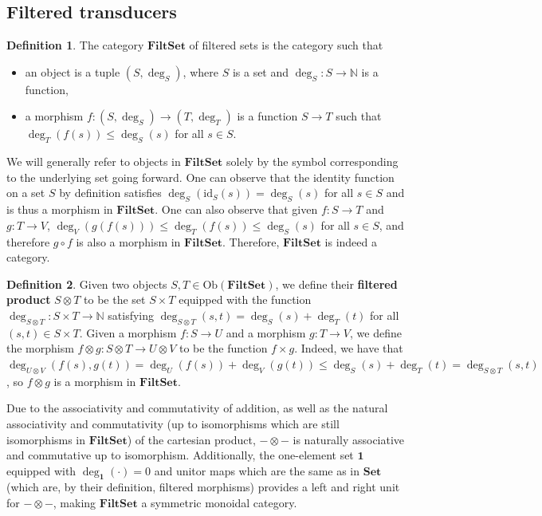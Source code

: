 \documentclass{article}
\theoremstyle{definition}
\newtheorem{definition}{Definition}[section]
\theoremstyle{remark}
\begin{document}
\subsection{Filtered transducers}
\begin{definition}
    \label{def:filtsetcat} The
    category $\mathbf{FiltSet}$ of filtered sets is the category such that
    \begin{itemize}
    \item an object is a tuple $(S,\deg_S)$, where $S$ is a set and
    $\deg_S:S \to \mathbb{N}$ is a function,
    \item a morphism $f:(S,\deg_S) \to (T,\deg_T)$ is a function
    $S \to T$ such that $\deg_T(f(s)) \leq \deg_S(s)$ for all $s\in S$. 
    \end{itemize}
\end{definition}
We will generally refer to objects in $\mathbf{FiltSet}$ solely
by the symbol corresponding to the underlying set going forward. One
can observe that the identity function on a set $S$ by definition satisfies
$\deg_S(\mathrm{id}_S(s))=\deg_S(s)$ for all $s \in S$ and is thus a
morphism in $\mathbf{FiltSet}$. One can also observe that given
$f:S\to T$ and $g:T \to V$,
$\deg_V(g(f(s))) \leq \deg_T(f(s)) \leq \deg_S(s)$ for all
$s \in S$, and therefore $g \circ f$ is also a morphism in
$\mathbf{FiltSet}$.
Therefore, $\mathbf{FiltSet}$ is indeed a category.

\begin{definition}
\label{def:filtsetproduct}
Given two objects $S,T \in \mathrm{Ob}(\mathbf{FiltSet})$,
we define
their \textbf{filtered product}
$S \otimes T$ to be the set $S \times T$ equipped
with the function $\deg_{S \otimes T}:S \times T \to \mathbb{N}$ satisfying
$\deg_{S\otimes T}(s,t) = \deg_S(s)+\deg_T(t)$ for all $(s,t) \in 
S\times T$. Given a morphism $f:S \to U$ and a morphism
$g:T\to V$, we define the morphism
$f\otimes g:S\otimes T \to U\otimes V$ to be the function $f\times g$.
Indeed, we have that $\deg_{U\otimes V}(f(s),g(t)) = 
\deg_U(f(s))+\deg_V(g(t))\leq \deg_S(s)+\deg_T(t) = \deg_{S\otimes T}(s,t)$,
so $f\otimes g$ is a morphism in
$\mathbf{FiltSet}$.
\end{definition}
Due to the associativity and commutativity of addition, as well
as the natural associativity and commutativity (up to isomorphisms which
are still isomorphisms in $\mathbf{FiltSet}$) of the cartesian product,
$-\otimes -$ is naturally associative and commutative up to isomorphism.
Additionally, the one-element set $\mathbf{1}$ equipped with
$\deg_{\mathbf{1}}(\cdot)=0$ and unitor maps which are the same as in
$\mathbf{Set}$ (which are, by their definition, filtered morphisms)
provides a
left and right unit for $-\otimes -$, making
$\mathbf{FiltSet}$ a symmetric monoidal category.
\end{document}
